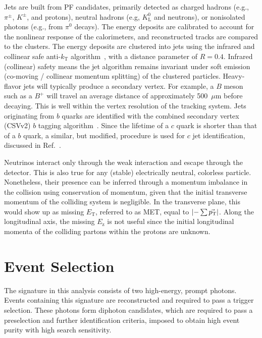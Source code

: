 Jets are built from PF candidates, primarily detected as charged hadrons (e.g., $\pi^{\pm}$, $K^{\pm}$, and protons), neutral hadrons (e.g, $K^0_{\mathrm{L}}$ and neutrons), or nonisolated photons (e.g., from $\pi^0$ decays). The energy deposits are calibrated to account for the nonlinear response of the calorimeters, and reconstructed tracks are compared to the clusters. The energy deposits are clustered into jets using the infrared and collinear safe anti-$k_{\mathrm{T}}$ algorithm~\cite{Cacciari:2008gp,Cacciari:2011ma}, with a distance parameter of $R = 0.4$. Infrared (collinear) safety means the jet algorithm remains invariant under soft emission (co-moving / collinear momentum splitting) of the clustered particles. Heavy-flavor jets will typically produce a secondary vertex. For example, a $B$ meson such as a $B^{+}$ will travel an average distance of approximately 500~$\mu$m before decaying. This is well within the vertex resolution of the tracking system. Jets originating from $b$ quarks are identified with the combined secondary vertex (CSVv2) $b$ tagging algorithm~\cite{Sirunyan:2017ezt}. Since the lifetime of a $c$ quark is shorter than that of a $b$ quark, a similar, but modified, procedure is used for $c$ jet identification, discussed in Ref.~\cite{Sirunyan:2017ezt}.

Neutrinos interact only through the weak interaction and escape through the detector. This is also true for any (stable) electrically neutral, colorless particle. Nonetheless, their presence can be inferred through a momentum imbalance in the collision using conservation of momentum, given that the initial transverse momentum of the colliding system is negligible. In the transverse plane, this would show up as missing $E_\mathrm{T}$, referred to as MET, equal to $\left| -\sum{\vec{\ensuremath{p_{\mathrm{T}}}}}\right|$. Along the longitudinal axis, the missing $E_\mathrm{z}$ is not useful since the initial longitudinal momenta of the colliding partons within the protons are unknown.


\section{Event Selection}

The signature in this analysis consists of two high-energy, prompt photons. Events containing this signature are reconstructed and required to pass a trigger selection. These photons form diphoton candidates, which are required to pass a preselection and further identification criteria, imposed to obtain high event purity with high search sensitivity.

